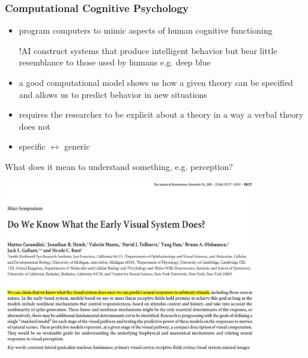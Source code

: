 \documentclass[]{beamer}
\begin{document}
\begin{frame}
 \frametitle{Computational Cognitive Psychology}
 \begin{itemize}
  \item program computers to mimic aspects of human cognitive functioning
  \item [!AI] construct systems that produce intelligent behavior but bear little resemblance to those used by humans e.g. deep blue
 \item a good computational model shows us how a given theory can be specified and allows us to predict behavior in new situations
 \item  requires the researcher to be explicit about a theory in a way a verbal theory does not
 \item specific $\longleftrightarrow$ generic 
 \end{itemize}
\end{frame}



\begin{frame}
\begin{overlayarea}{120mm}{70mm}
\begin{center}
  What does it mean to understand something, e.g. perception? 
\end{center}


\end{overlayarea}
\end{frame}


\begin{frame}
  \begin{center}  
\includegraphics[width=110mm]{figs/what_early_visual_system.png}
  \end{center}
\end{frame}
\end{document}
